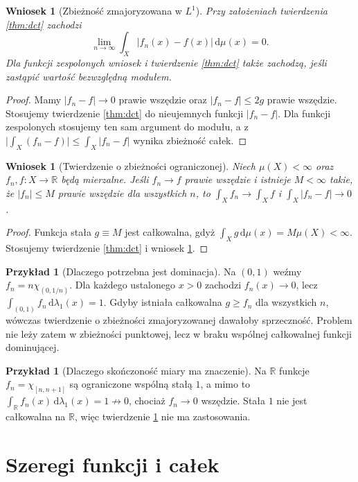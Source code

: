 \documentclass[11pt,a4paper,oneside]{book}
\numberwithin{equation}{chapter}
\theoremstyle{plain}
\newtheorem{wniosek}[twierdzenie]{Wniosek}
\theoremstyle{definition}
\newtheorem{przyklad}[twierdzenie]{Przykład}
\theoremstyle{remark}
\begin{document}
\begin{wniosek}[Zbieżność zmajoryzowana w $L^1$]
\label{cor:dct-l1}
Przy założeniach twierdzenia \ref{thm:dct} zachodzi
\[
\lim_{n\to\infty}\int_X|f_n(x)-f(x)|\,\mathrm d\mu(x)=0.
\]
Dla funkcji zespolonych wniosek i twierdzenie
\ref{thm:dct} także zachodzą, jeśli zastąpić
wartość bezwzględną modułem.
\end{wniosek}
\begin{proof}
Mamy $|f_n-f|\to0$ prawie wszędzie oraz
$|f_n-f|\le2g$ prawie wszędzie.
Stosujemy twierdzenie \ref{thm:dct} do nieujemnych
funkcji $|f_n-f|$. Dla funkcji zespolonych
stosujemy ten sam argument do modułu, a z
$\bigl|\int_X(f_n-f)\bigr|\le\int_X|f_n-f|$
wynika zbieżność całek.
\end{proof}

\begin{wniosek}[Twierdzenie o zbieżności ograniczonej]
\label{cor:bct}
Niech $\mu(X)<\infty$ oraz $f_n,f:X\to\mathbb R$
będą mierzalne. Jeśli $f_n\to f$ prawie wszędzie
i istnieje $M<\infty$ takie, że $|f_n|\le M$
prawie wszędzie dla wszystkich $n$, to
$\int_X f_n\to\int_X f$ i $\int_X|f_n-f|\to0$.
\end{wniosek}
\begin{proof}
Funkcja stała $g\equiv M$ jest całkowalna,
gdyż $\int_X g\,\mathrm d\mu(x)=M\mu(X)<\infty$.
Stosujemy twierdzenie \ref{thm:dct} i wniosek
\ref{cor:dct-l1}.
\end{proof}

\begin{przyklad}[Dlaczego potrzebna jest dominacja]
Na $(0,1)$ weźmy
$f_n=n\chi_{(0,1/n)}$.
Dla każdego ustalonego $x>0$ zachodzi $f_n(x)\to0$,
lecz $\int_{(0,1)}f_n\,\mathrm d\lambda_1(x)=1$.
Gdyby istniała całkowalna $g\ge f_n$ dla wszystkich
$n$, wówczas twierdzenie o zbieżności zmajoryzowanej
dawałoby sprzeczność. Problem nie leży zatem
w zbieżności punktowej, lecz w braku wspólnej
całkowalnej funkcji dominującej.
\end{przyklad}

\begin{przyklad}[Dlaczego skończoność miary ma znaczenie]
Na $\mathbb R$ funkcje $f_n=\chi_{[n,n+1]}$
są ograniczone wspólną stałą $1$, a mimo to
$\int_{\mathbb R}f_n(x)\,\mathrm d\lambda_1(x)=1\not\to0$, chociaż $f_n\to0$ wszędzie.
Stała $1$ nie jest całkowalna na $\mathbb R$,
więc twierdzenie \ref{cor:bct} nie ma zastosowania.
\end{przyklad}

\section{Szeregi funkcji i całek}
\end{document}
